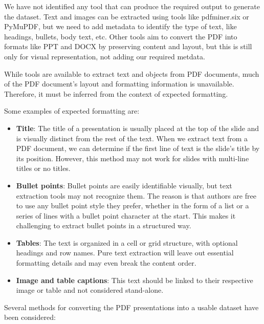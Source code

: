 We have not identified any tool that can produce the required output to generate the dataset.  Text and images can be extracted using tools like pdfminer.six or PyMuPDF, but we need to add metadata to identify the type of text, like headings, bullets, body text, etc. Other tools aim to convert the PDF into formats like PPT and DOCX by preserving content and layout, but this is still only for visual representation, not adding our required metdata.

While tools are available to extract text and objects from PDF documents, much of the PDF document's layout and formatting information is unavailable. Therefore, it must be inferred from the context of expected formatting. 

Some examples of expected formatting are:

\begin{itemize}
    \item \textbf{Title}: The title of a presentation is usually placed at the top of the slide and is visually distinct from the rest of the text. When we extract text from a PDF document, we can determine if the first line of text is the slide's title by its position. However, this method may not work for slides with multi-line titles or no titles.
    \item \textbf{Bullet points}: Bullet points are easily identifiable visually, but text extraction tools may not recognize them. The reason is that authors are free to use any bullet point style they prefer, whether in the form of a list or a series of lines with a bullet point character at the start. This makes it challenging to extract bullet points in a structured way. 
    \item \textbf{Tables}: The text is organized in a cell or grid structure, with optional headings and row names. Pure text extraction will leave out essential formatting details and may even break the content order. 
    \item \textbf{Image and table captions}: This text should be linked to their respective image or table and not considered stand-alone.
\end{itemize}

Several methods for converting the PDF presentations into a usable dataset have been considered:

